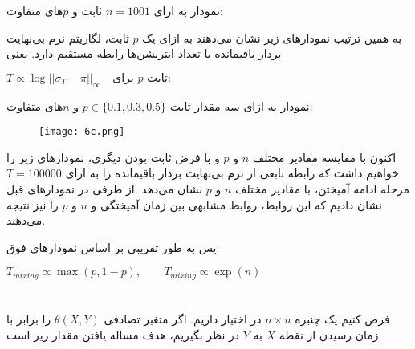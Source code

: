 \documentclass{scribe-cgenomics}
\begin{document}
نمودار به ازای
$n=1001$
ثابت و
$p$های
متفاوت:

\begin{figure}[h]
\label{6_p_relation}
\centering
\end{figure}


به همین ترتیب نمودارهای زیر نشان می‌دهند به ازای یک
$p$
ثابت، لگاریتم نرم بی‌نهایت بردار باقیمانده با تعداد ایتریشن‌ها رابطه مستقیم دارد. یعنی

\begin{center}
$
T \propto \log|| \sigma_T - \pi||_{\infty}
\quad \text{برای $p$ ثابت:}
$
\end{center}

نمودار به ازای سه مقدار ثابت
$p \in \{0.1, 0.3, 0.5 \}$
و
$n$های
متفاوت:

\begin{figure}[h]\label{6_n_relation}
\texttt{[image: 6c.png]}
\centering
\end{figure}

اکنون با مقایسه مقادیر مختلف
$n$
و
$p$
و با فرض ثابت بودن دیگری، نمودارهای زیر را خواهیم داشت که رابطه تابعی از نرم بی‌نهایت بردار باقیمانده را به ازای
$T = 100000$
مرحله ادامه آمیختن، با مقادیر مختلف
$n$
و
$p$
نشان می‌دهد. از طرفی در نمودارهای قبل نشان دادیم که این روابط، روابط مشابهی بین زمان آمیختگی و
$n$
و
$p$
را نیز نتیجه می‌دهند.

\begin{figure}[h]
\label{6_relations}
\centering
\end{figure}


پس به طور تقریبی بر اساس نمودارهای فوق:

\begin{center}
$
T_{mixing} \propto \max(p, 1-p),
\qquad
T_{mixing} \propto \exp(n)
$
\end{center}

\newpage
\section{}


فرض کنیم یک چنبره
$n\times n$
در اختیار داریم. اگر متغیر تصادفی
$\theta(X,Y)$
را برابر با زمان رسیدن از نقطه
$X$
به
$Y$
در نظر بگیریم، هدف مساله یافتن مقدار زیر است:
\end{document}
